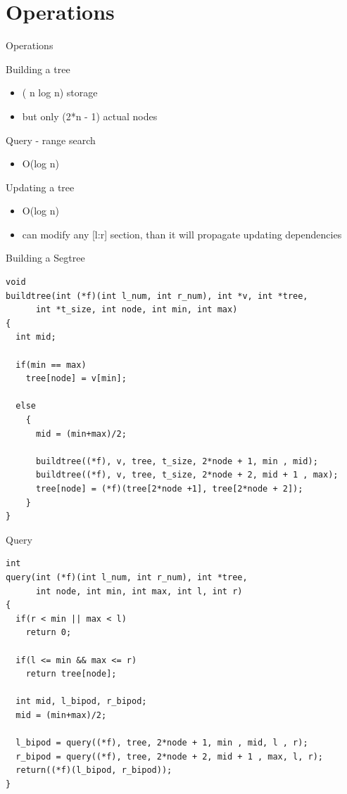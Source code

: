\documentclass[presentation,9pt]{beamer}
\begin{document}
\section{Operations}
\label{sec:org9315c9c}
\begin{frame}[label={sec:org191c94e}]{Operations}
\begin{block}{Building a tree}
\begin{itemize}
\item ( n log n) storage
\item but only (2*n - 1) actual nodes
\end{itemize}
\end{block}
\begin{block}{Query - range search}
\begin{itemize}
\item O(log n)
\end{itemize}
\end{block}
\begin{block}{Updating a tree}
\begin{itemize}
\item O(log n)
\item can modify any [l:r] section, than it will propagate updating dependencies
\end{itemize}
\end{block}
\end{frame}
\begin{frame}[fragile,label={sec:org5b4f4ac}]{Building a Segtree}
 \begin{verbatim}
void
buildtree(int (*f)(int l_num, int r_num), int *v, int *tree,
	  int *t_size, int node, int min, int max)
{
  int mid;
  
  if(min == max)
    tree[node] = v[min];

  else
    {
      mid = (min+max)/2;
      
      buildtree((*f), v, tree, t_size, 2*node + 1, min , mid);
      buildtree((*f), v, tree, t_size, 2*node + 2, mid + 1 , max);
      tree[node] = (*f)(tree[2*node +1], tree[2*node + 2]);
    }
}
\end{verbatim}
\end{frame}
\begin{frame}[fragile,label={sec:orgad4216a}]{Query}
 \begin{verbatim}
int
query(int (*f)(int l_num, int r_num), int *tree,
      int node, int min, int max, int l, int r)
{
  if(r < min || max < l)
    return 0;
  
  if(l <= min && max <= r)
    return tree[node];
  
  int mid, l_bipod, r_bipod;  
  mid = (min+max)/2;
  
  l_bipod = query((*f), tree, 2*node + 1, min , mid, l , r);
  r_bipod = query((*f), tree, 2*node + 2, mid + 1 , max, l, r);
  return((*f)(l_bipod, r_bipod));
}
\end{verbatim}
\end{frame}
\end{document}
